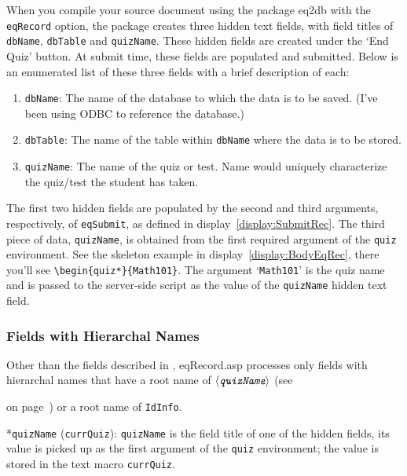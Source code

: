 \documentclass{article}
\makeatletter
\let\bslash=\@backslashchar
\renewcommand{\paragraph}
    {\@startsection{paragraph}{4}{0pt}{6pt}{-3pt}
    {\normalfont\normalsize\bfseries}}
\def\cs#1{\texttt{\bslash#1}}
\def\anglemeta#1{$\langle\textit{\texttt{#1}}\rangle$}
\let\pkg\textsf
\let\env\texttt
\def\bNH{\begin{NoHyper}}\def\eNH{\end{NoHyper}}
\def\nhnameref#1{\bNH\nameref{#1}\eNH}
\makeatother
\begin{document}
When you compile your source document using the package
\pkg{eq2db} with the \texttt{eqRecord} option, the package
creates three hidden text fields, with field titles of
\texttt{dbName}, \texttt{dbTable} and \texttt{quizName}. These
hidden fields are created under the `End Quiz' button. At submit time,
these fields are populated and submitted. Below is an enumerated list
of these three fields with a brief description of each:
\begin{enumerate}
    \item \texttt{dbName}: The name of the database to which the
        data is to be saved. (I've been using ODBC to reference the database.)
    \item \texttt{dbTable}: The name of the table within \texttt{dbName} where the data
          is to be stored.
    \item \texttt{quizName}: The name of the quiz or test. Name would uniquely characterize
          the quiz/test the student has taken.
\end{enumerate}
The first two hidden fields are populated by the second and third arguments,
respectively, of \cs{eqSubmit}, as defined in
display~\eqref{display:SubmitRec}. The third piece of data,
\texttt{quizName}, is obtained from the first required argument of the
\env{quiz} environment. See the skeleton example in
display~\eqref{display:BodyEqRec}, there you'll see
\verb~\begin{quiz*}{Math101}~. The argument `\texttt{Math101}' is the quiz
name and is passed to the server-side script as the value of the
\texttt{quizName} hidden text field.


\subsubsection{Fields with Hierarchal Names}\label{hierarchalfields}

Other than the fields described in , \textsf{eqRecord.asp} processes
only fields with hierarchal names that have a root name of \anglemeta{quizName}
(see \nhnameref{hardwired} on page~\pageref{hardwired}) or a root name of \texttt{IdInfo}.

\paragraph*{\texttt{quizName} (\cs{currQuiz}):} \texttt{quizName} is the field title of one of the hidden fields,
its value is picked up as the first argument of the \env{quiz}
environment; the value is stored in the text macro \cs{currQuiz}.
\end{document}
